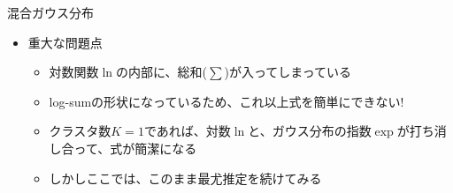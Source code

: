 \documentclass[dvipdfmx,notheorems,t]{beamer}
\begin{document}
\begin{frame}{混合ガウス分布}
\begin{itemize}
	\item 重大な問題点
	\begin{itemize}
		\item \color{red} 対数関数$\ln$の内部に、総和($\displaystyle \sum$)が入ってしまっている \normalcolor
		\item log-sumの形状になっているため、\alert{これ以上式を簡単にできない!}
		\item クラスタ数$K = 1$であれば、対数$\ln$と、ガウス分布の指数$\exp$が打ち消し合って、式が簡潔になる
		\newline
		\item しかしここでは、このまま最尤推定を続けてみる
	\end{itemize}
\end{itemize}

\end{frame}
\end{document}
